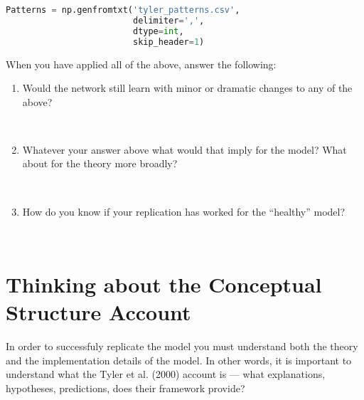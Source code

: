 \documentclass[a4paper,10pt]{article}
\begin{document}
\begin{lstlisting}[language=Python]
Patterns = np.genfromtxt('tyler_patterns.csv',
                         delimiter=',',
                         dtype=int,
                         skip_header=1)
\end{lstlisting}

When you have applied all of the above, answer the following:

\begin{enumerate}

\item Would the network still learn with minor or dramatic changes to any of the above?

\ \\

\item Whatever your answer above what would that imply for the model? What about for the theory more broadly?

\ \\

\item How do you know if your replication has worked for the ``healthy'' model?

\ \\

\end{enumerate}

\section{Thinking about the Conceptual Structure Account}
In order to successfuly replicate the model you must understand both the theory and the implementation details of the model. In other words, it is important to understand what the Tyler et al. (2000) account is --- what explanations, hypotheses, predictions, does their framework provide?
\end{document}
